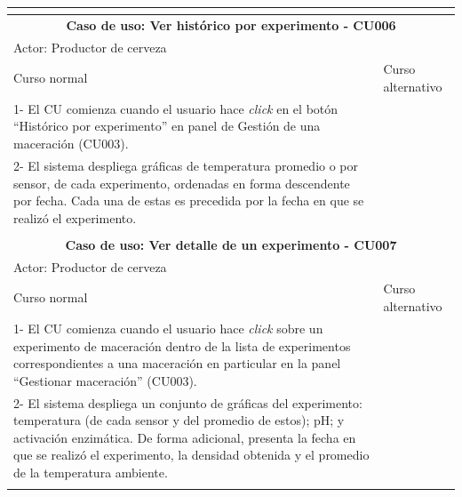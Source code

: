 \begin{longtable}{|p{7cm}|p{7cm}|}
        \multicolumn{2}{c}{ }\\
        \hline
        
        \multicolumn{2}{|c|}{ \textbf{Caso de uso: Ver histórico por experimento - CU006}}\\
        \hline
        \multicolumn{2}{|l|}{Actor: Productor de cerveza} \\
        \hline
        Curso normal & Curso alternativo \\
        \hline
        1- El CU comienza cuando el usuario hace \textit{click} en el botón ``Histórico por experimento'' en panel de Gestión de una maceración (CU003). & \\
        \hline
        2- El sistema despliega gráficas de temperatura promedio o por sensor, de cada experimento, ordenadas en forma descendente por fecha. Cada una de estas es precedida por la fecha en que se realizó el experimento. &
        \\
        \hline
        \multicolumn{2}{c}{ }\\
        \hline
        
        \multicolumn{2}{|c|}{ \textbf{Caso de uso: Ver detalle de un experimento - CU007}}\\
        \hline
        \multicolumn{2}{|l|}{Actor: Productor de cerveza} \\
        \hline
        Curso normal & Curso alternativo \\
        \hline
        1- El CU comienza cuando el usuario hace \textit{click} sobre un experimento de maceración dentro de la lista de experimentos correspondientes a una maceración en particular en la panel ``Gestionar maceración'' (CU003). & \\
        \hline
        2- El sistema despliega un conjunto de gráficas del experimento: temperatura (de cada sensor y del promedio de estos); pH; y activación enzimática. De forma adicional, presenta la fecha en que se realizó el experimento, la densidad obtenida y el promedio de la temperatura ambiente. &
        \\
        \hline
        \multicolumn{2}{c}{ }\\
        \hline
    

\end{longtable}
